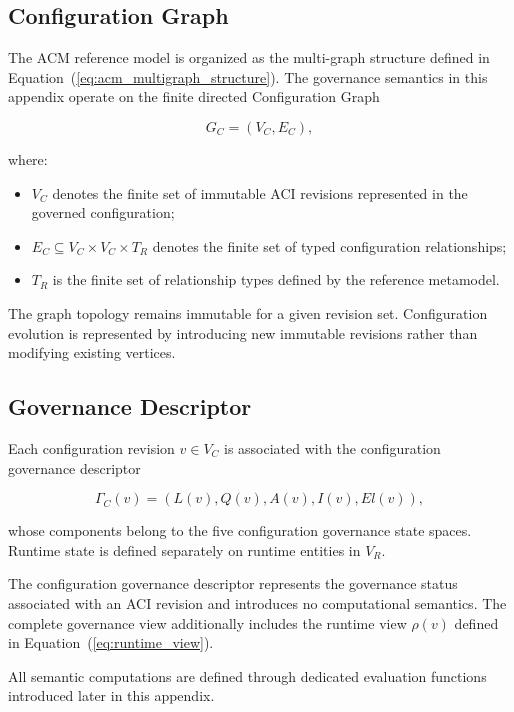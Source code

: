 \documentclass[10pt]{article}
\begin{document}
\subsection{Configuration Graph}
The ACM reference model is organized as the multi-graph structure defined in Equation~(\ref{eq:acm_multigraph_structure}). The governance semantics in this appendix operate on the finite directed Configuration Graph

\begin{equation}
	G_C=(V_C,E_C),
	\label{eq:graph_definition}
\end{equation}

where:

\begin{itemize}
	\item $V_C$ denotes the finite set of immutable ACI revisions represented in the governed configuration;
	\item $E_C\subseteq V_C\times V_C\times T_R$ denotes the finite set of typed configuration relationships;
	\item $T_R$ is the finite set of relationship types defined by the reference metamodel.
\end{itemize}
The graph topology remains immutable for a given revision set. Configuration evolution is represented by introducing new immutable revisions rather than modifying existing vertices.

\subsection{Governance Descriptor}

Each configuration revision $v\in V_C$ is associated with the
configuration governance descriptor

\begin{equation}
	\Gamma_C(v)=
	\left(
	L(v),
	Q(v),
	A(v),
	I(v),
	El(v)
	\right),
	\label{eq:descriptor_definition}
\end{equation}

whose components belong to the five configuration governance state spaces.
Runtime state is defined separately on runtime entities in $V_R$.

The configuration governance descriptor represents the governance status associated with an ACI revision and introduces no computational semantics. The complete governance view additionally includes the runtime view $\rho(v)$ defined in Equation~(\ref{eq:runtime_view}).


All semantic computations are defined through dedicated evaluation functions introduced later in this appendix.
\end{document}
